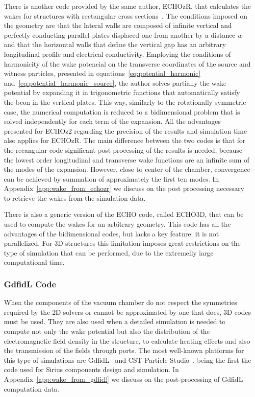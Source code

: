     There is another code provided by the same author, ECHOzR, that calculates the wakes for structures with rectangular cross sections~\cite{Zagorodnov2015}. The conditions imposed on the geometry are that the lateral walls are composed of infinite vertical and perfectly conducting parallel plates displaced one from another by a distance $w$ and that the horizontal walls that define the vertical gap has an arbitrary longitudinal profile and electrical conductivity. Employing the conditions of harmonicity of the wake potencial on the transverse coordinates of the source and witness particles, presented in equations~\eqref{eq:potential_harmonic} and~\eqref{eq:potential_harmonic_source}, the author solves partially the wake potential by expanding it in trigonometric functions that automatically satisfy the \gls{bcon} in the vertical plates. This way, similarly to the rotationally symmetric case, the numerical computation is reduced to a bidimensional problem that is solved independently for each term of the expansion. All the advantages presented for ECHOz2 regarding the precision of the results and simulation time also applies for ECHOzR. The main difference between the two codes is that for the recangular code significant post-processing of the results is needed, because the lowest order longitudinal and transverse wake functions are an infinite sum of the modes of the expansion. However, close to center of the chamber, convergence can be achieved by summation of approximately the first ten modes. In Appendix~\ref{app:wake_from_echozr} we discuss on the post processing necessary to retrieve the wakes from the simulation data.

    There is also a generic version of the ECHO code, called ECHO3D, that can be used to compute the wakes for an arbitrary geometry. This code has all the advantages of the bidimensional codes, but lacks a key feature: it is not parallelized. For 3D structures this limitation imposes great restrictions on the type of simulation that can be performed, due to the extremelly large computational time.

\subsubsection{GdfidL Code}

    When the components of the vacuum chamber do not respect the symmetries required by the 2D solvers or cannot be approximated by one that does, 3D codes must be used. They are also used when a detailed simulation is needed to compute not only the wake potential but also the distribution of the electromagnetic field density in the structure, to calculate heating effects and also the transmission of the fields through ports. The most well-known platforms for this type of simulations are GdfidL~\cite{Bruns1997, Bruns2017} and CST Particle Studio~\cite{CST2017}, being the first the code used for Sirius components design and simulation. In Appendix~\ref{app:wake_from_gdfidl} we discuss on the post-processing of GdfidL computation data.

